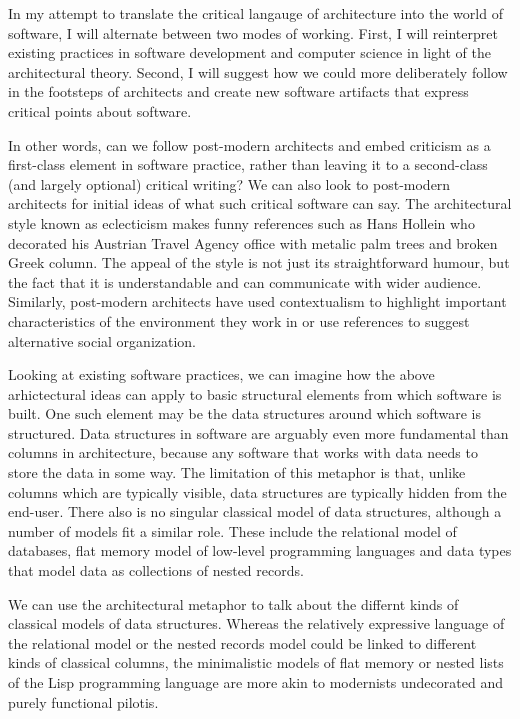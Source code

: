 In my attempt to translate the critical langauge of architecture into the world of software,
I will alternate between two modes of working. First, I will reinterpret existing practices
in software development and computer science in light of the architectural theory. Second,
I will suggest how we could more deliberately follow in the footsteps of architects and
create new software artifacts that express critical points about software.

In other words, can we follow post-modern architects and embed criticism as a first-class
element in software practice, rather than leaving it to a second-class (and largely optional)
critical writing? We can also look to
post-modern architects for initial ideas of what such critical software can say. The
architectural style known as eclecticism makes funny references such as Hans Hollein who
decorated his Austrian Travel Agency office with metalic palm trees and broken Greek
column. The appeal of the style is not just its straightforward humour,
but the fact that it is understandable and can communicate with wider audience. Similarly,
post-modern architects have used contextualism to highlight important characteristics of the
environment they work in or use references to suggest alternative social organization.

Looking at existing software practices, we can imagine how the above arhictectural ideas
can apply to basic structural elements from which software is built. One such element may
be the data structures around which software is structured. Data structures
in software are arguably even more fundamental than columns in architecture, because any
software that works with data needs to store the data in some way. The limitation of this
metaphor is that, unlike columns which are typically visible, data structures are typically
hidden from the end-user. There also is no singular classical model of data structures,
although a number of models fit a similar role. These include the relational model of databases,
flat memory model of low-level programming languages and data types that model data as collections
of nested records.

We can use the architectural metaphor to talk about the differnt kinds of classical models
of data structures. Whereas the relatively expressive language of the relational model or
the nested records model could be linked to different kinds of classical columns, the minimalistic
models of flat memory or nested lists of the Lisp programming language are more akin to
modernists undecorated and purely functional pilotis.

